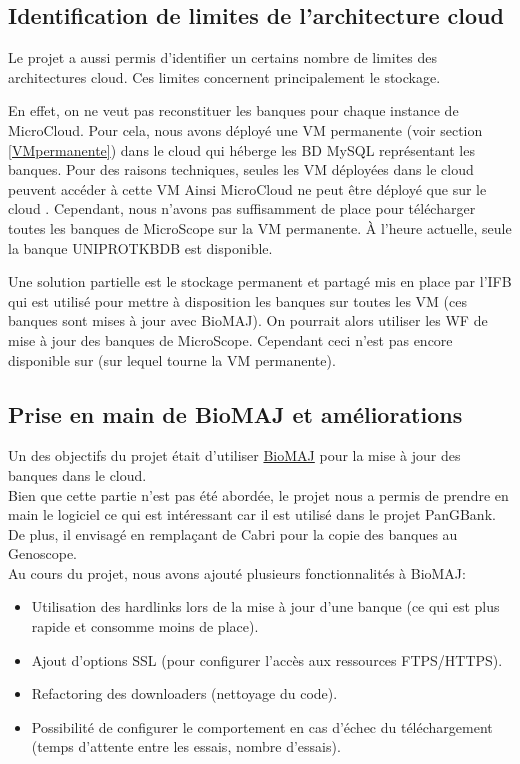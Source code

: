 \subsection{Identification de limites de l'architecture cloud} \label{subsec:limites_coud}

Le projet a aussi permis d'identifier un certains nombre de limites des architectures cloud.
Ces limites concernent principalement le stockage.

En effet, on ne veut pas reconstituer les banques pour chaque instance de MicroCloud.
Pour cela, nous  avons déployé une VM permanente (voir section \ref{VMpermanente}) dans le cloud 
qui héberge les BD MySQL représentant les banques.
Pour des raisons techniques, seules les VM déployées dans le cloud 
peuvent accéder à cette VM
Ainsi MicroCloud ne peut être déployé que sur le cloud .
Cependant, nous n'avons pas suffisamment de place pour télécharger toutes les banques de MicroScope sur la VM permanente.
À l'heure actuelle, seule la banque UNIPROTKBDB est disponible.

Une solution partielle est le stockage permanent et partagé mis en place par l'IFB
qui est utilisé pour mettre à disposition les banques sur toutes les VM (ces banques sont mises à jour avec BioMAJ).
On pourrait alors utiliser les WF de mise à jour des banques de MicroScope.
Cependant ceci n'est pas encore disponible sur  (sur lequel tourne la VM permanente).

\subsection{Prise en main de BioMAJ et améliorations}\label{subsec:biomaj}

Un des objectifs du projet était d'utiliser \href{https://biomaj.genouest.org/}{BioMAJ}
pour la mise à jour des banques dans le cloud.\\

Bien que cette partie n'est pas été abordée, le projet nous a permis de prendre en main le logiciel
ce qui est intéressant car il est utilisé dans le projet PanGBank.
De plus, il envisagé en remplaçant de Cabri pour la copie des banques au Genoscope.\\

Au cours du projet, nous avons ajouté plusieurs fonctionnalités à BioMAJ:
\begin{itemize}
	\item Utilisation des hardlinks lors de la mise à jour d'une banque (ce qui est plus rapide et consomme moins de place).
	\item Ajout d'options SSL (pour configurer l'accès aux ressources FTPS/HTTPS).
	\item Refactoring des downloaders (nettoyage du code).
	\item Possibilité de configurer le comportement en cas d'échec du téléchargement (temps d'attente entre les essais, nombre d'essais).
\end{itemize}

